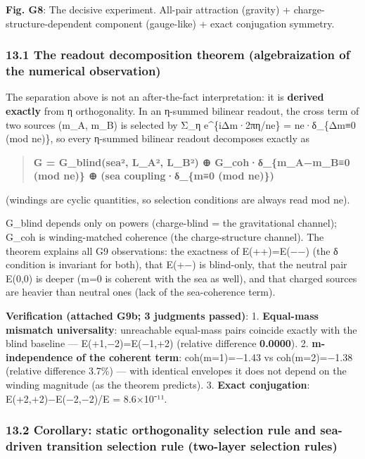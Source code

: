\documentclass[
]{article}
\begin{document}
\textbf{Fig. G8}: The decisive experiment. All-pair attraction (gravity)
+ charge-structure-dependent component (gauge-like) + exact conjugation
symmetry.

\subsubsection{13.1 The readout decomposition theorem (algebraization of
the numerical
observation)}\label{the-readout-decomposition-theorem-algebraization-of-the-numerical-observation}

The separation above is not an after-the-fact interpretation: it is
\textbf{derived exactly} from η orthogonality. In an η-summed bilinear
readout, the cross term of two sources (m\_A, m\_B) is selected by Σ\_η
e\^{}\{iΔm·2πη/ne\} = ne·δ\_\{Δm≡0 (mod ne)\}, so every η-summed
bilinear readout decomposes exactly as

\begin{quote}
\textbf{G = G\_blind(\textbar sea\textbar², \textbar L\_A\textbar²,
\textbar L\_B\textbar²) ⊕ G\_coh·δ\_\{m\_A−m\_B≡0 (mod ne)\} ⊕ (sea
coupling·δ\_\{m≡0 (mod ne)\})}
\end{quote}

(windings are cyclic quantities, so selection conditions are always read
mod ne).

G\_blind depends only on powers (charge-blind = the gravitational
channel); G\_coh is winding-matched coherence (the charge-structure
channel). The theorem explains all G9 observations: the exactness of
E(++)=E(−−) (the δ condition is invariant for both), that E(+−) is
blind-only, that the neutral pair E(0,0) is deeper (m=0 is coherent with
the sea as well), and that charged sources are heavier than neutral ones
(lack of the sea-coherence term).

\textbf{Verification (attached G9b; 3 judgments passed)}: 1.
\textbf{Equal-mass mismatch universality}: unreachable equal-mass pairs
coincide exactly with the blind baseline --- E(+1,−2)=E(−1,+2) (relative
difference \textbf{0.0000}). 2. \textbf{\textbar m\textbar-independence
of the coherent term}: coh(m=1)=−1.43 vs coh(m=2)=−1.38 (relative
difference 3.7\%) --- with identical envelopes it does not depend on the
winding magnitude (as the theorem predicts). 3. \textbf{Exact
conjugation}: \textbar E(+2,+2)−E(−2,−2)\textbar/\textbar E\textbar{} =
8.6×10⁻¹¹.

\subsubsection{13.2 Corollary: static orthogonality selection rule and
sea-driven transition selection rule (two-layer selection
rules)}\label{corollary-static-orthogonality-selection-rule-and-sea-driven-transition-selection-rule-two-layer-selection-rules}
\end{document}
